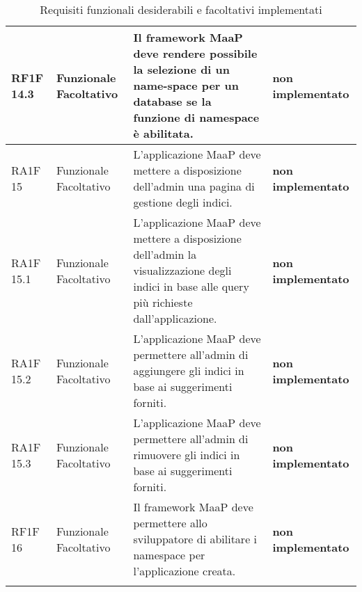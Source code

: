 \begin{longtable}{ | l | p{2cm} | p{5cm} | p{4cm}| }
        RF1F 14.3 & Funzionale \newline  Facoltativo  & Il framework MaaP deve rendere possibile la selezione di un name-space per un database se la funzione di namespace è abilitata. & \textbf{{\color{red} non implementato}} \newline  \\ \hline      
        RA1F 15 & Funzionale \newline  Facoltativo  & L’applicazione MaaP deve mettere a disposizione dell’admin una pagina di gestione degli indici. & \textbf{{\color{red} non implementato}} \newline  \\ \hline      
        RA1F 15.1 & Funzionale \newline  Facoltativo  & L’applicazione MaaP deve mettere a disposizione dell’admin la visualizzazione degli indici in base alle query più richieste dall’applicazione. & \textbf{{\color{red} non implementato}} \newline  \\ \hline      
        RA1F 15.2 & Funzionale \newline  Facoltativo  & L’applicazione MaaP deve permettere all’admin di aggiungere gli indici in base ai suggerimenti forniti. & \textbf{{\color{red} non implementato}} \newline  \\ \hline      
        RA1F 15.3 & Funzionale \newline  Facoltativo  & L’applicazione MaaP deve permettere all’admin di rimuovere gli indici in base ai suggerimenti forniti. & \textbf{{\color{red} non implementato}} \newline  \\ \hline      
        RF1F 16 & Funzionale \newline  Facoltativo  & Il framework MaaP deve permettere allo sviluppatore di abilitare i namespace per l’applicazione creata. & \textbf{{\color{red} non implementato}} \newline  \\ \hline      
       
      \caption{Requisiti funzionali desiderabili e facoltativi implementati}
      \end{longtable}
      \egroup 
\clearpage